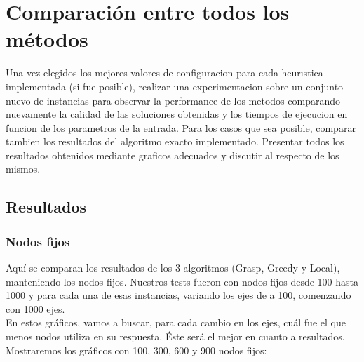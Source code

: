 \section{Comparaci\'on entre todos los m\'etodos} \label{ej6}

Una vez elegidos los mejores valores de configuracion para cada heurıstica implementada (si fue posible), realizar una experimentacion sobre un conjunto nuevo de instancias para observar la performance
de los metodos comparando nuevamente la calidad de las soluciones obtenidas y los tiempos de ejecucion en funcion de los parametros de la entrada. 
Para los casos que sea posible, comparar tambien los resultados del algoritmo exacto implementado.
Presentar todos los resultados obtenidos mediante graficos adecuados y discutir al respecto de los mismos.
\subsection{Resultados}
\subsubsection{Nodos fijos}
Aqu\'i se comparan los resultados de los 3 algoritmos (Grasp, Greedy y Local), manteniendo los nodos fijos. Nuestros tests fueron con nodos fijos desde 100 hasta 1000 y para cada una de esas instancias,
variando los ejes de a 100, comenzando con 1000 ejes.\\

En estos gr\'aficos, vamos a buscar, para cada cambio en los ejes, cu\'al fue el que menos nodos utiliza en su respuesta. \'Este ser\'a el mejor en cuanto a resultados.\\

Mostraremos los gr\'aficos con 100, 300, 600 y 900 nodos fijos:

